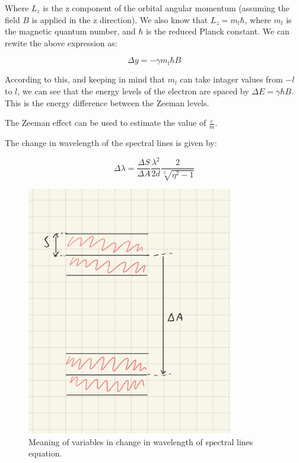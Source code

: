 Where $L_z$ is the z component of the orbital angular momentum (assuming the field $B$ is applied in the z direction). We also know that
$L_z = m_l \hbar$, where $m_l$ is the magnetic quantum number, and $\hbar$ is the reduced Planck constant. We can rewite the above expression as:

\begin{equation}
    \Delta y = - \gamma m_l \hbar B
\end{equation}

According to this, and keeping in mind that $m_l$ can take intager values from $-l$ to $l$, we can see that the energy levels of the electron
are spaced by $\Delta E = \gamma \hbar B$. This is the energy difference between the Zeeman levels.



The Zeeman effect can be used to estimate the value of $\frac{e}{m}$.

The change in wavelength of the spectral lines is given by:

\begin{equation}
    \Delta \lambda = \frac{\Delta S}{\Delta A} \frac{\lambda^2}{2d} \frac{2}{\sqrt[2]{\eta^2 - 1}}
\end{equation}


\begin{figure}
    \centering
    \includegraphics[width=0.8\textwidth]{intro/lambda_calc_diagram.jpeg}
    \caption{Meaning of variables in change in wavelength of spectral lines equation.}
    \label{fig:variables_lambda}
\end{figure}

